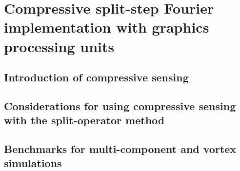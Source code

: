 \chapter{Compressive split-step Fourier implementation with graphics processing units}
\label{ch-cssfm}

\section{Introduction of compressive sensing}

\section{Considerations for using compressive sensing with the split-operator method}

\section{Benchmarks for multi-component and vortex simulations}
